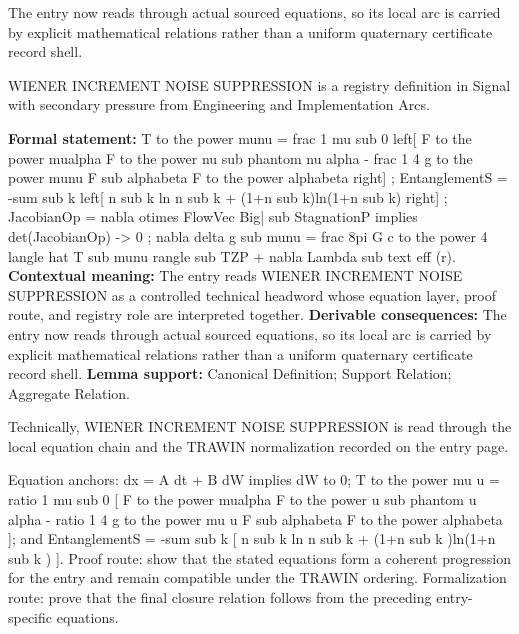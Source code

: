 The entry now reads through actual sourced equations, so its local arc is carried by explicit mathematical relations rather than a uniform quaternary certificate record shell.
\clearpage


\begingroup\small
{}
WIENER INCREMENT NOISE SUPPRESSION is a registry definition in Signal with secondary pressure from Engineering and Implementation Arcs.

\begingroup\footnotesize\setlength{\emergencystretch}{3em}\sloppy
\textbf{Formal statement:} T to the power munu = frac 1 mu sub 0 left[ F to the power mualpha F to the power nu sub phantom nu alpha - frac 1 4 g to the power munu F sub alphabeta F to the power alphabeta right] ; EntanglementS = -sum sub k left[ n sub k ln n sub k + (1+n sub k)ln(1+n sub k) right] ; JacobianOp = nabla otimes FlowVec Big| sub StagnationP implies det(JacobianOp) -> 0 ; nabla delta g sub munu = frac 8pi G c to the power 4 langle hat T sub munu rangle sub TZP + nabla Lambda sub text eff (r). \textbf{Contextual meaning:} The entry reads WIENER INCREMENT NOISE SUPPRESSION as a controlled technical headword whose equation layer, proof route, and registry role are interpreted together. \textbf{Derivable consequences:} The entry now reads through actual sourced equations, so its local arc is carried by explicit mathematical relations rather than a uniform quaternary certificate record shell. \textbf{Lemma support:} Canonical Definition; Support Relation; Aggregate Relation.\par
\endgroup

Technically, WIENER INCREMENT NOISE SUPPRESSION is read through the local equation chain and the TRAWIN normalization recorded on the entry page.

Equation anchors: dx = A dt + B dW implies dW to 0; T to the power mu u = ratio 1 mu sub 0 [ F to the power mualpha F to the power u sub phantom u alpha - ratio 1 4 g to the power mu u F sub alphabeta F to the power alphabeta ]; and EntanglementS = -sum sub k [ n sub k ln n sub k + (1+n sub k )ln(1+n sub k ) ]. Proof route: show that the stated equations form a coherent progression for the entry and remain compatible under the TRAWIN ordering. Formalization route: prove that the final closure relation follows from the preceding entry-specific equations.

